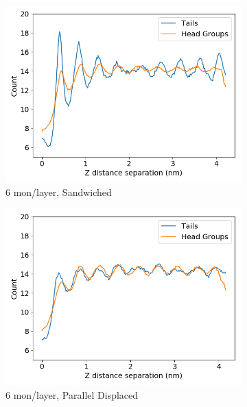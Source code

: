 \documentclass{article}
\begin{document}
\begin{figure}
\begin{subfigure}{0.40\textwidth}
                \centering
                \includegraphics[width=\textwidth]{zdf_layered_6.png}
                \caption{6 mon/layer, Sandwiched}\label{fig:zdf_layered_6}
        \end{subfigure}
        \begin{subfigure}{0.40\textwidth}
                \centering
                \includegraphics[width=\textwidth]{zdf_offset_6.png}
                \caption{6 mon/layer, Parallel Displaced}\label{fig:zdf_layered_6}
        \end{subfigure}
        \begin{subfigure}{0.40\textwidth}
                \centering

\end{subfigure}
\end{figure}
\end{document}
